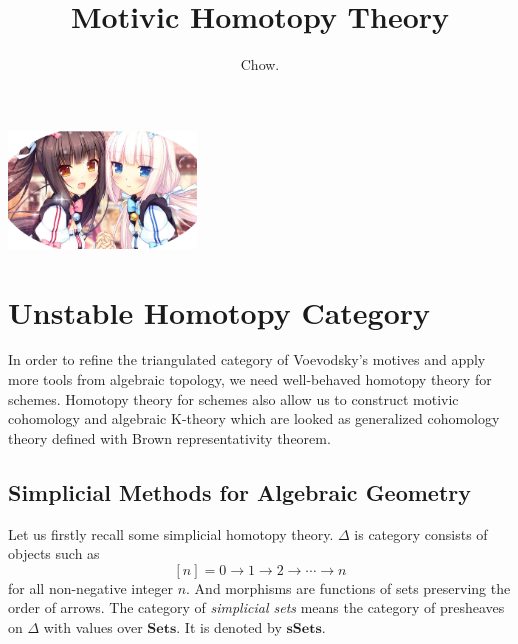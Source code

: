 \documentclass[b5paper,10pt]{article}
\title{Motivic Homotopy Theory}
\author{Chow.}
\date{}
\begin{document}
\maketitle
\begin{center}
	\includegraphics[width=5cm]{PIC/NEKOPARA.jpg}
\end{center}
\tableofcontents
	\section{Unstable Homotopy Category}
	In order to refine the triangulated category of Voevodsky's motives and apply more tools from algebraic topology, we need well-behaved homotopy theory for schemes. Homotopy theory for schemes also allow us to construct motivic cohomology and algebraic K-theory which are looked as generalized cohomology theory defined with Brown representativity theorem.
	\subsection{Simplicial Methods for Algebraic Geometry}
	Let us firstly recall some simplicial homotopy theory.
	$\Delta$ is category consists of objects such as
	\[
	[n]={0 \to 1 \to 2 \to \cdots \to n}
	\]
	for all non-negative integer $n$. And morphisms are functions of sets preserving the order of arrows.
	The category of \emph{simplicial sets} means the category of presheaves on $\Delta$ with values over $\mathbf{Sets}$. It is denoted by $\mathbf{sSets}$.
	
\end{document}
